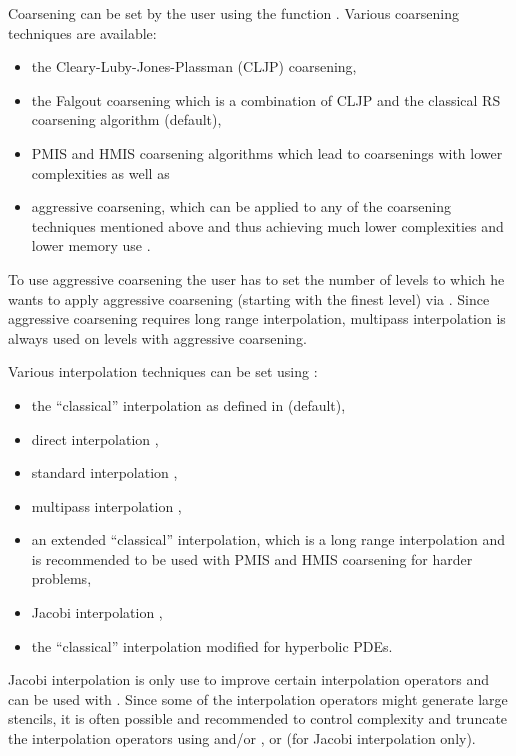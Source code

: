 Coarsening can be set by the user using the function .
Various coarsening techniques are available:
\begin{itemize}
\item the Cleary-Luby-Jones-Plassman (CLJP) coarsening,
\item the Falgout coarsening which is a combination of CLJP and the
classical RS coarsening algorithm (default),
\item PMIS and HMIS coarsening algorithms which lead to coarsenings with lower complexities \cite{DeSterck_Yang_Heys_2004}
as well as
\item aggressive coarsening, which can be applied to any of the coarsening techniques mentioned above and thus achieving much lower complexities and lower memory use \cite{Stueben_1999}.
\end{itemize}
To use aggressive coarsening the user has to set the number of levels to which he wants to apply
aggressive coarsening (starting with the finest level) 
via . Since aggressive coarsening requires long range
interpolation, multipass interpolation is always used on levels with aggressive coarsening.

Various interpolation techniques can be set using :
\begin{itemize}
\item the ``classical'' interpolation as defined in \cite{Ruge_Stueben_1987} (default),
\item direct interpolation \cite{Stueben_1999},
\item standard interpolation \cite{Stueben_1999},
\item multipass interpolation \cite{Stueben_1999},
\item an extended ``classical'' interpolation, which is a long range interpolation and is recommended to be used with PMIS and HMIS coarsening for harder problems,
\item Jacobi interpolation \cite{Stueben_1999},
\item the ``classical'' interpolation modified for hyperbolic PDEs.
\end{itemize}
Jacobi interpolation is only use to improve certain interpolation operators and can be 
used with .
Since some of the interpolation operators might generate large stencils, it is often possible 
and recommended to control complexity and truncate the interpolation operators
using  and/or ,
or  (for Jacobi interpolation only).

